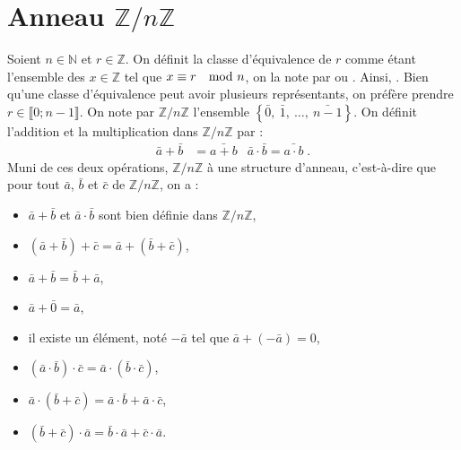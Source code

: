       \section{Anneau $\mathbb{Z}/n\mathbb{Z}$}
      Soient $n\in\mathbb{N}$ et $r\in\mathbb{Z}$.
      On d\'efinit la classe d'\'equivalence de $r$ comme \'etant 
      l'ensemble des $x\in\mathbb{Z}$ tel que $x \equiv r \quad \mathrm{mod}\ n$, 
      on la note par  ou .
      Ainsi,
      .
      Bien qu'une classe d'\'equivalence peut avoir plusieurs repr\'esentants, 
      on pr\'ef\`ere prendre $ r \in \llbracket 0 ; n-1 \rrbracket$.
      On note par $\mathbb{Z}/n\mathbb{Z}$ l'ensemble 
      $\left\lbrace \bar{0},\ \bar{1},\ \ldots ,\ \bar{n-1} \right\rbrace$.
      On d\'efinit l'addition et la multiplication dans $\mathbb{Z}/n\mathbb{Z}$ par :       
      \begin{align*}
            \bar{a} + \bar{b} & = \bar{a+b}       & \bar{a} \cdot \bar{b} = \bar{a\cdot b} \;.
      \end{align*}
      Muni de ces deux op\'erations, $\mathbb{Z}/n\mathbb{Z}$ \`a une structure d'anneau, 
      c'est-\`a-dire que pour tout $\bar{a}$, $\bar{b}$ et $\bar{c}$ de $\mathbb{Z}/n\mathbb{Z}$, on a :
            \begin{itemize}
                  \item $\bar{a} + \bar{b}$ et $\bar{a} \cdot \bar{b}$ sont bien d\'efinie dans $\mathbb{Z}/n\mathbb{Z}$,
                  \item $(\bar{a} + \bar{b}) + \bar{c} = \bar{a} + (\bar{b} + \bar{c})$,
                  \item $\bar{a} + \bar{b} = \bar{b} + \bar{a}$,
                  \item $\bar{a} + \bar{0} = \bar{a}$,
                  \item il existe un \'el\'ement, not\'e $-\bar{a}$ tel que $\bar{a} + (-\bar{a}) = 0$,
                  \item $(\bar{a} \cdot \bar{b}) \cdot \bar{c} = \bar{a} \cdot (\bar{b} \cdot \bar{c})$,
                  \item $\bar{a} \cdot (\bar{b} + \bar{c}) = \bar{a} \cdot \bar{b} + \bar{a} \cdot \bar{c}$,
                  \item $(\bar{b} + \bar{c}) \cdot \bar{a} = \bar{b} \cdot \bar{a} + \bar{c} \cdot \bar{a}$.
            \end{itemize}
